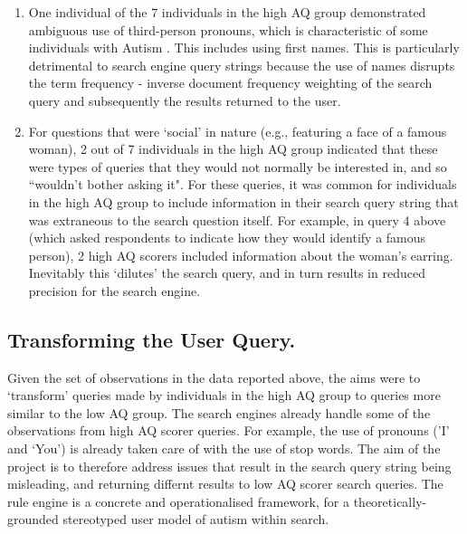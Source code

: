 \documentclass[a4paper, 11pt]{article}
\begin{document}
\begin{enumerate}
\item{One individual of the 7 individuals in the high AQ group demonstrated ambiguous use of third-person pronouns, which is characteristic of some individuals with Autism \cite{pronoun}. This includes using first names. This is particularly detrimental to search engine query strings because the use of names disrupts the term frequency - inverse document frequency weighting \cite{tfidf} of the search query and subsequently the results returned to the user.
}\label{pronoun}
 
\item{
For questions that were `social' in nature (e.g., featuring a face of a famous woman), 2 out of 7 individuals in the high AQ group indicated that these were types of queries that they would not normally be interested in, and so ``wouldn't bother asking it". For these queries, it was common for individuals in the high AQ group to include information in their search query string that was extraneous to the search question itself. For example, in query 4 above (which asked respondents to indicate how they would identify a famous person), 2 high AQ scorers included information about the woman's earring. Inevitably this `dilutes' the search query, and in turn results in reduced precision for the search engine.
}

\end{enumerate}


\subsection{Transforming the User Query.}
Given the set of observations in the data reported above, the aims were to `transform' queries made by individuals in the high AQ group to queries more similar to the low AQ group. The search engines already handle some of the observations from high AQ scorer queries. For example, the use of pronouns ('I' and `You') is already taken care of with the use of stop words. The aim of the project is to therefore address issues that result in the search query string being misleading, and returning differnt results to low AQ scorer search queries. The rule engine is a concrete and operationalised framework, for a theoretically-grounded stereotyped user model of autism within search. \\
\end{document}
